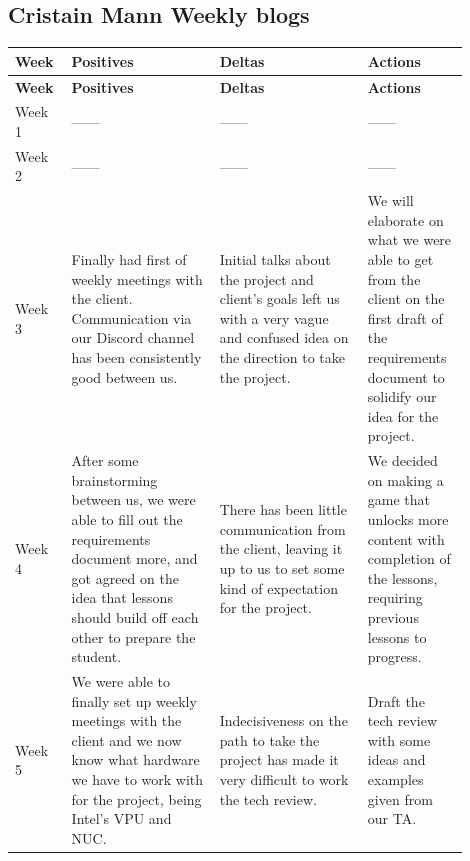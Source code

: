 \documentclass[draftclsnofoot,10pt,onecolumn]{IEEEtran}
\begin{document}
\subsection{Cristain Mann Weekly blogs}
        \begin{longtable}{p{0.1\linewidth}p{0.3\linewidth}p{0.3\linewidth}p{0.2\linewidth}}
        \hline
            \textbf{Week}
             & \textbf{Positives}
             & \textbf{Deltas}
             & \textbf{Actions}\\
             \hline
             \endfirsthead
             \textbf{Week}
             & \textbf{Positives}
             & \textbf{Deltas}
             & \textbf{Actions}\\
             \hline
            \endhead
             Week 1
             & ------
             & ------
             & ------\\
             \hline
             Week 2
             & ------
             & ------
             & ------\\
             \hline
             Week 3
             & Finally had first of weekly meetings with the client. Communication via our Discord channel has been consistently good between us.
             & Initial talks about the project and client's goals left us with a very vague and confused idea on the direction to take the project.
             & We will elaborate on what we were able to get from the client on the first draft of the requirements document to solidify our idea for the project.\\
            \hline
             Week 4
             & After some brainstorming between us, we were able to fill out the requirements document more, and got agreed on the idea that lessons should build off each other to prepare the student.
             & There has been little communication from the client, leaving it up to us to set some kind of expectation for the project.
             & We decided on making a game that unlocks more content with completion of the lessons, requiring previous lessons to progress.\\
            \hline
             Week 5
             & We were able to finally set up weekly meetings with the client and we now know what hardware we have to work with for the project, being Intel's VPU and NUC.
             & Indecisiveness on the path to take the project has made it very difficult to work the tech review.
             & Draft the tech review with some ideas and examples given from our TA.\\
            \hline

\end{longtable}
\end{document}
